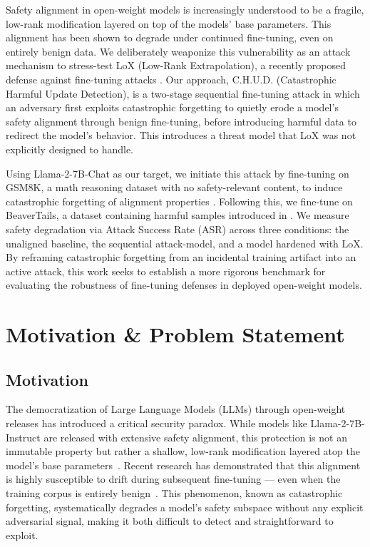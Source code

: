 \documentclass[letterpaper,twocolumn,10pt]{article}
\begin{document}

Safety alignment in open-weight models is increasingly understood to be a fragile, low-rank modification layered on top of the models' base parameters. This alignment has been shown to degrade under continued fine-tuning, even on entirely benign data. We deliberately weaponize this vulnerability as an attack mechanism to stress-test LoX (Low-Rank Extrapolation), a recently proposed defense against fine-tuning attacks \cite{perin2025loxlowrankextrapolationrobustifies}. Our approach, C.H.U.D. (Catastrophic Harmful Update Detection), is a two-stage sequential fine-tuning attack in which an adversary first exploits catastrophic forgetting to quietly erode a model's safety alignment through benign fine-tuning, before introducing harmful data to redirect the model's behavior. This introduces a threat model that LoX was not explicitly designed to handle.

Using Llama-2-7B-Chat as our target, we initiate this attack by fine-tuning on GSM8K, a math reasoning dataset with no safety-relevant content, to induce catastrophic forgetting of alignment properties \cite{cobbe2021training}. Following this, we fine-tune on BeaverTails, a dataset containing harmful samples introduced in \cite{ji2023beavertails}. We measure safety degradation via Attack Success Rate (ASR) across three conditions: the unaligned baseline, the sequential attack-model, and a model hardened with LoX. By reframing catastrophic forgetting from an incidental training artifact into an active attack, this work seeks to establish a more rigorous benchmark for evaluating the robustness of fine-tuning defenses in deployed open-weight models. 

\section{Motivation \& Problem Statement}

\subsection{Motivation}

The democratization of Large Language Models (LLMs) through 
open-weight releases has introduced a critical security paradox. 
While models like Llama-2-7B-Instruct are released with extensive 
safety alignment, this protection is not an immutable property but 
rather a shallow, low-rank modification layered atop the model's 
base parameters~\cite{perin2025loxlowrankextrapolationrobustifies}. Recent research has demonstrated that 
this alignment is highly susceptible to drift during subsequent 
fine-tuning --- even when the training corpus is entirely 
benign~\cite{li-etal-2024-revisiting,huang2024harmfulfinetuningattacksdefenses}. This phenomenon, known as catastrophic 
forgetting, systematically degrades a model's safety subspace 
without any explicit adversarial signal, making it both difficult 
to detect and straightforward to exploit.
\end{document}
